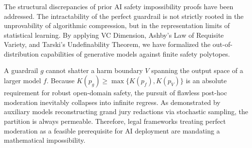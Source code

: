 \documentclass[11pt,twoside,letterpaper]{article}
\begin{document}
The structural discrepancies of prior AI safety impossibility proofs have been addressed. The intractability of the perfect guardrail is not strictly rooted in the unprovability of algorithmic compression, but in the representation limits of statistical learning. By applying VC Dimension, Ashby's Law of Requisite Variety, and Tarski's Undefinability Theorem, we have formalized the out-of-distribution capabilities of generative models against finite safety polytopes.

A guardrail $g$ cannot shatter a harm boundary $V$ spanning the output space of a larger model $f$. Because $K(p_g) \geq \max\{K(p_f), K(p_V)\}$ is an absolute requirement for robust open-domain safety, the pursuit of flawless post-hoc moderation inevitably collapses into infinite regress. As demonstrated by 
auxiliary models reconstructing grand jury redactions via stochastic sampling, 
the partition is always permeable. Therefore, legal frameworks treating perfect moderation as a feasible prerequisite for AI deployment are mandating a mathematical impossibility.
\end{document}
